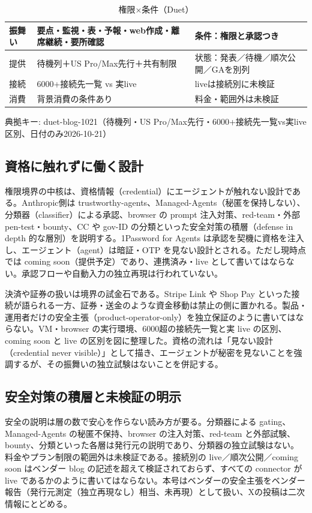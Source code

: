 \documentclass[lualatex,a4paper,10pt]{jlreq}
\begin{document}
\begin{table}[htbp]\centering\footnotesize
\caption{権限×条件（Duet）}
\begin{tabularx}{0.96\linewidth}{@{}lXX@{}}
\toprule
振舞い & 要点・監視・表・予報・web作成・離席継続・要所確認 & 条件：権限と承認つき \\
\midrule
提供 & 待機列＋US Pro/Max先行＋共有制限 & 状態：発表／待機／順次公開／GAを別列 \\
接続 & 6000+接続先一覧 vs 実live & liveは接続別に未検証 \\
消費 & 背景消費の条件あり & 料金・範囲外は未検証 \\
\bottomrule
\end{tabularx}
{\scriptsize\color{SurveyMuted} 典拠キー: duet-blog-1021（待機列・US Pro/Max先行・6000+接続先一覧vs実live区別、日付のみ2026-10-21）\par}
\end{table}


\subsection*{資格に触れずに働く設計}


権限境界の中核は、資格情報（credential）にエージェントが触れない設計である。Anthropic側は trustworthy-agents、Managed-Agents（秘匿を保持しない）、分類器（classifier）による承認、browser の prompt 注入対策、red-team・外部 pen-test・bounty、CC や gov-ID の分類といった安全対策の積層（defense in depth 的な層別）を説明する。1Password for Agents は承認を契機に資格を注入し、エージェント（agent）は暗証・OTP を見ない設計とされる。ただし現時点では coming soon（提供予定）であり、連携済み・live として書いてはならない。承認フローや自動入力の独立再現は行われていない。


決済や証券の扱いは境界の試金石である。Stripe Link や Shop Pay といった接続が語られる一方、証券・送金のような資金移動は禁止の側に置かれる。製品・運用者だけの安全主張（product-operator-only）を独立保証のように書いてはならない。VM・browser の実行環境、6000超の接続先一覧と実 live の区別、coming soon と live の区別を図に整理した。資格の流れは「見ない設計（credential never visible）」として描き、エージェントが秘密を見ないことを強調するが、その振舞いの独立試験はないことを併記する。


\subsection*{安全対策の積層と未検証の明示}


安全の説明は層の数で安心を作らない読み方が要る。分類器による gating、Managed-Agents の秘匿不保持、browser の注入対策、red-team と外部試験、bounty、分類といった各層は発行元の説明であり、分類器の独立試験はない。料金やプラン制限の範囲外は未検証である。接続別の live／順次公開／coming soon はベンダー blog の記述を超えて検証されておらず、すべての connector が live であるかのように書いてはならない。本号はベンダーの安全主張をベンダー報告（発行元測定（独立再現なし）相当、未再現）として扱い、Xの投稿は二次情報にとどめる。
\end{document}
